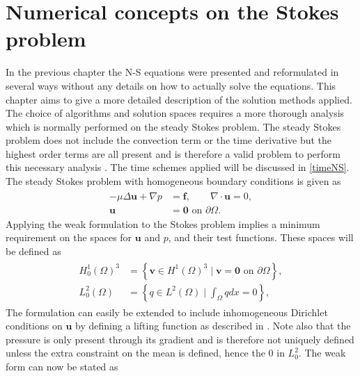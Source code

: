 


\section{Numerical concepts on the Stokes problem} \label{stokes}
In the previous chapter the N-S equations were presented and reformulated in several ways without any details on how to
actually solve the equations. This chapter aims to give a more detailed description of the solution methods applied.
The choice of algorithms and solution spaces requires a more thorough analysis which is normally performed on the 
steady Stokes problem. The steady Stokes problem does not include the convection term or the time derivative 
but the highest order terms are all present and is therefore a valid problem to perform this necessary
analysis \cite{Karniadakis}. The time schemes applied will be discussed in \cref{timeNS}.
The steady Stokes problem with homogeneous boundary conditions is given as 
%
\begin{align}
    \begin{split}
        - \mu \Delta \mathbf{u} + \nabla p &= \mathbf{f}, \qquad \nabla \cdot \mathbf{u} = 0, \\
        \mathbf{u} &= \mathbf{0} \text{  on  } \partial \Omega.
    \end{split}
    \label{eq:stokes}
\end{align}
%
Applying the weak formulation to the Stokes problem implies a minimum requirement on the spaces for $\mathbf{u}$ and $p$,
and their test functions. These spaces will be defined as 
%
\begin{align}
    \begin{split}
        H_0^1(\Omega)^{3} &= \left\{ \mathbf{v} \in H^1(\Omega)^{3}\; |
        \; \mathbf{v} = \mathbf{0} \text{  on  } \partial \Omega \right\},\\
    L_0^2(\Omega) &= \left\{ q \in L^2(\Omega)\; |\; \int_{\Omega} q dx = 0 \right\},
    \end{split}
    \label{eq:spaces}
\end{align}
%
The formulation can easily be extended to include inhomogeneous Dirichlet conditions on $\mathbf{u}$ by defining a 
lifting function as described in \cite{Quarteroni}. Note also that the pressure is only present through its gradient 
and is therefore not uniquely defined unless the extra constraint on the mean is defined, hence the $0$ in $L_0^2$. 
The weak form can now be stated as

